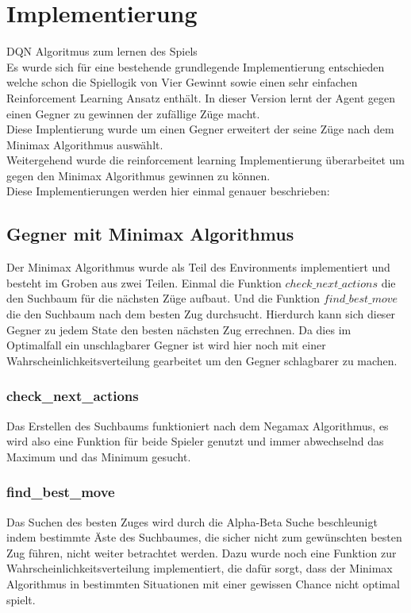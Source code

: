\chapter{Implementierung}%

\label{cha:Implementierung}

\colorbox{red!30}{DQN Algoritmus zum lernen des Spiels}\\

Es wurde sich für eine bestehende grundlegende Implementierung entschieden welche schon die Spiellogik von Vier Gewinnt sowie einen sehr einfachen Reinforcement Learning Ansatz enthält. In dieser Version lernt der Agent gegen einen Gegner zu gewinnen der zufällige Züge macht.\\
Diese Implentierung wurde um einen Gegner erweitert der seine Züge nach dem Minimax Algorithmus auswählt.\\
Weitergehend wurde die reinforcement learning Implementierung überarbeitet um gegen den Minimax Algorithmus gewinnen zu können.\\
Diese Implementierungen werden hier einmal genauer beschrieben:\\

\section{Gegner mit Minimax Algorithmus}
Der Minimax Algorithmus wurde als Teil des Environments implementiert und besteht im Groben aus zwei Teilen. Einmal die Funktion $check\_next\_actions$ die den Suchbaum für die nächsten Züge aufbaut. Und die Funktion $find\_best\_move$ die den Suchbaum nach dem besten Zug durchsucht. Hierdurch kann sich dieser Gegner zu jedem State den besten nächsten Zug errechnen. Da dies im Optimalfall ein unschlagbarer Gegner ist wird hier noch mit einer Wahrscheinlichkeitsverteilung gearbeitet um den Gegner schlagbarer zu machen.

\subsection{check\_next\_actions}
Das Erstellen des Suchbaums funktioniert nach dem Negamax Algorithmus, es wird also eine Funktion für beide Spieler genutzt und immer abwechselnd das Maximum und das Minimum gesucht.

\subsection{find\_best\_move}
Das Suchen des besten Zuges wird durch die Alpha-Beta Suche beschleunigt indem bestimmte Äste des Suchbaumes, die sicher nicht zum gewünschten besten Zug führen, nicht weiter betrachtet werden. Dazu wurde noch eine Funktion zur Wahrscheinlichkeitsverteilung implementiert, die dafür sorgt, dass der Minimax Algorithmus in bestimmten Situationen mit einer gewissen Chance nicht optimal spielt.

